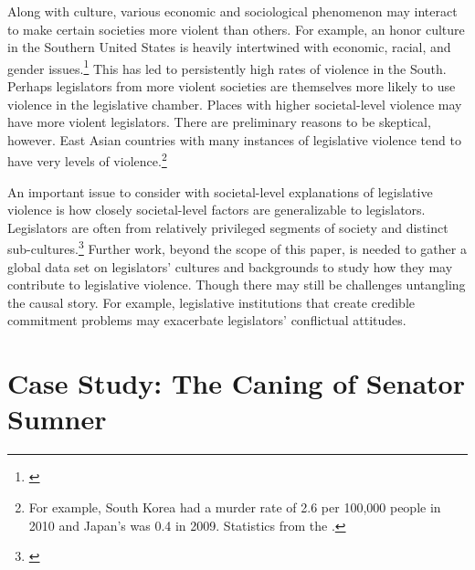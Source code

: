 \documentclass[a4paper]{article}\usepackage[]{graphicx}\usepackage[]{color}
\begin{document}
Along with culture, various economic and sociological phenomenon may interact to make certain societies more violent than others. For example, an honor culture in the Southern United States is heavily intertwined with economic, racial, and gender issues.\footnote{\citealt{nisbett1996culture}} This has led to persistently high rates of violence in the South. Perhaps legislators from more violent societies are themselves more likely to use violence in the legislative chamber. Places with higher societal-level violence may have more violent legislators. There are preliminary reasons to be skeptical, however. East Asian countries with many instances of legislative violence tend to have very levels of violence.\footnote{For example, South Korea had a murder rate of 2.6 per 100,000 people in 2010 and Japan's was 0.4 in 2009. Statistics from the \citealt{UNMurder2013}.}

An important issue to consider with societal-level explanations of legislative violence is how closely societal-level factors are generalizable to legislators. Legislators are often from relatively privileged segments of society and distinct sub-cultures.\footnote{\citealt[408]{Spary2013}} Further work, beyond the scope of this paper, is needed to gather a global data set on legislators' cultures and backgrounds to study how they may contribute to legislative violence. Though there may still be challenges untangling the causal story. For example, legislative institutions that create credible commitment problems may exacerbate legislators' conflictual attitudes.   

\section{Case Study: The Caning of Senator Sumner}
\end{document}
